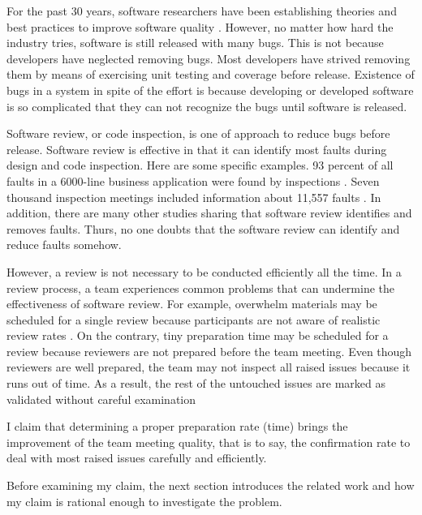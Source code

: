 \documentclass[11pt,twocolumn]{article}
\begin{document}
 \label{sec:intro}

For the past 30 years, software researchers have been establishing
theories and best practices to improve software quality
\cite{Parnas2003}. However, no matter how hard the industry tries,
software is still released with many bugs. This is not because
developers have neglected removing bugs. Most developers have
strived removing them by means of exercising unit testing and
coverage before release. Existence of bugs in a system in spite of
the effort is because developing or developed software is so
complicated that they can not recognize the bugs until software is
released.

Software review, or code inspection, is one of approach to reduce
bugs before release. Software review is effective in that it can
identify most faults during design and code inspection. Here are
some specific examples. 93 percent of all faults in a 6000-line
business application were found by inspections \cite{Pfleeger2001}.
Seven thousand inspection meetings included information about 11,557
faults \cite{Pfleeger2001}. In addition, there are many other
studies sharing that software review identifies and removes faults.
Thurs, no one doubts that the software review can identify and
reduce faults somehow.

However, a review is not necessary to be conducted efficiently all
the time. In a review process, a team experiences common problems
that can undermine the effectiveness of software review. For
example, overwhelm materials may be scheduled for a single review
because participants are not aware of realistic review rates
\cite{Wiegers1998}. On the contrary, tiny preparation time may be
scheduled for a review because reviewers are not prepared before the
team meeting. Even though reviewers are well prepared, the team may
not inspect all raised issues because it runs out of time. As a
result, the rest of the untouched issues are marked as validated
without careful examination

I claim that determining a proper preparation rate (time) brings the
improvement of the team meeting quality, that is to say, the
confirmation rate to deal with most raised issues carefully and
efficiently.

Before examining my claim, the next section introduces the related
work and how my claim is rational enough to investigate the problem.

 \label{sec:relatedWork}
\end{document}
